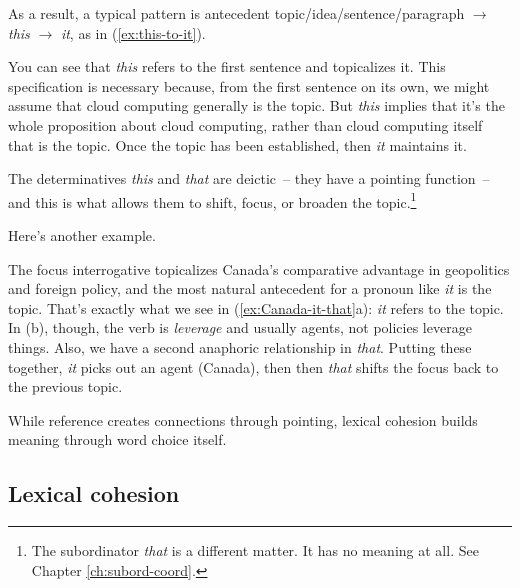 As a result, a typical pattern is antecedent topic/idea/sentence/paragraph $\rightarrow$ \textit{this} $\rightarrow$ \textit{it}, as in (\ref{ex:this-to-it}).

\label{ex:this-to-it}
\z

You can see that \textit{this} refers to the first sentence and topicalizes it. This specification is necessary because, from the first sentence on its own, we might assume that cloud computing generally is the topic. But \textit{this} implies that it's the whole proposition about cloud computing, rather than cloud computing itself that is the topic. Once the topic has been established, then \textit{it} maintains it.

The determinatives \textit{this} and \textit{that} are deictic~-- they have a pointing function~-- and this is what allows them to shift, focus, or broaden the topic.\footnote{The subordinator \textit{that} is a different matter. It has no meaning at all. See Chapter \ref{ch:subord-coord}.}

Here's another example.

\ea \label{ex:Canada-it-that}
    \z
\z

The focus interrogative topicalizes Canada's comparative advantage in geopolitics and foreign policy, and the most natural antecedent for a pronoun like \textit{it} is the topic. That's exactly what we see in  (\ref{ex:Canada-it-that}a): \textit{it} refers to the topic. In (b), though, the verb is \textit{leverage} and usually agents, not policies leverage things. Also, we have a second anaphoric relationship in \textit{that}. Putting these together, \textit{it} picks out an agent (Canada), then then \textit{that} shifts the focus back to the previous topic.

\bigskip

While reference creates connections through pointing, lexical cohesion builds meaning through word choice itself.

\subsection{Lexical cohesion}

